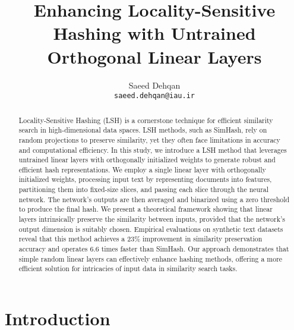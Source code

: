 \documentclass{article}
\title{Enhancing Locality-Sensitive Hashing with Untrained Orthogonal Linear Layers}
\author{
 Saeed Dehqan \\
  \texttt{saeed.dehqan@iau.ir} \\
}
\begin{document}
\maketitle
\begin{abstract}
Locality-Sensitive Hashing (LSH) is a cornerstone technique for efficient similarity search in high-dimensional data spaces. LSH methods, such as SimHash, rely on random projections to preserve similarity, yet they often face limitations in accuracy and computational efficiency. In this study, we introduce a LSH method that leverages untrained linear layers with orthogonally initialized weights to generate robust and efficient hash representations. We employ a single linear layer with orthogonally initialized weights, processing input text by representing documents into features, partitioning them into fixed-size slices, and passing each slice through the neural network. The network's outputs are then averaged and binarized using a zero threshold to produce the final hash. We present a theoretical framework showing that linear layers intrinsically preserve the similarity between inputs, provided that the network's output dimension is suitably chosen. Empirical evaluations on synthetic text datasets reveal that this method achieves a 23\% improvement in similarity preservation accuracy and operates 6.6 times faster than SimHash. Our approach demonstrates that simple random linear layers can effectively enhance hashing methods, offering a more efficient solution for intricacies of input data in similarity search tasks.
\end{abstract}




\section{Introduction}
\end{document}
